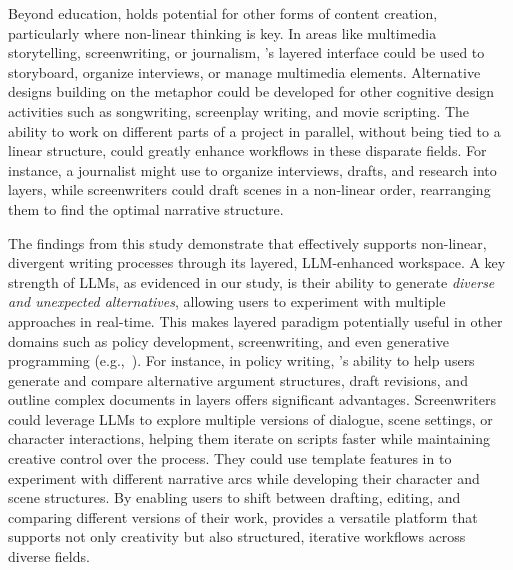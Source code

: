 Beyond education, \system holds potential for other forms of content creation, particularly where non-linear thinking is key. In areas like multimedia storytelling, screenwriting, or journalism, \system’s layered interface could be used to storyboard, organize interviews, or manage multimedia elements. Alternative designs building on the \system metaphor could be developed for other cognitive design activities such as songwriting, screenplay writing, and movie scripting. The ability to work on different parts of a project in parallel, without being tied to a linear structure, could greatly enhance workflows in these disparate fields. For instance, a journalist might use \system to organize interviews, drafts, and research into layers, while screenwriters could draft scenes in a non-linear order, rearranging them to find the optimal narrative structure.

The findings from this study demonstrate that \system effectively supports non-linear, divergent writing processes through its layered, LLM-enhanced workspace. A key strength of LLMs, as evidenced in our study, is their ability to generate \textit{diverse and unexpected alternatives}, allowing users to experiment with multiple approaches in real-time. This makes \systems layered paradigm potentially useful in other domains such as policy development, screenwriting, and even generative programming (e.g.,~\cite{angert2023spellburst}). For instance, in policy writing, \system’s ability to help users generate and compare alternative argument structures, draft revisions, and outline complex documents in layers offers significant advantages. Screenwriters could leverage LLMs to explore multiple versions of dialogue, scene settings, or character interactions, helping them iterate on scripts faster while maintaining creative control over the process. They could use template features in \system to experiment with different narrative arcs while developing their character and scene structures. By enabling users to shift between drafting, editing, and comparing different versions of their work, \system provides a versatile platform that supports not only creativity but also structured, iterative workflows across diverse fields.

